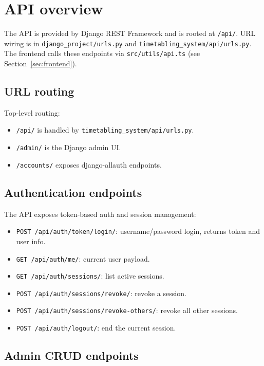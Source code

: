 \section{API overview}
\label{sec:api}

The API is provided by Django REST Framework and is rooted at \texttt{/api/}. URL wiring is in \texttt{django\_project/urls.py} and \texttt{timetabling\_system/api/urls.py}. The frontend calls these endpoints via \texttt{src/utils/api.ts} (see Section~\ref{sec:frontend}).

\subsection{URL routing}
\label{subsec:api:routing}

Top-level routing:

\begin{itemize}
  \item \texttt{/api/} is handled by \texttt{timetabling\_system/api/urls.py}.
  \item \texttt{/admin/} is the Django admin UI.
  \item \texttt{/accounts/} exposes django-allauth endpoints.
\end{itemize}

\subsection{Authentication endpoints}
\label{subsec:api:auth}

The API exposes token-based auth and session management:

\begin{itemize}
  \item \texttt{POST /api/auth/token/login/}: username/password login, returns token and user info.
  \item \texttt{GET /api/auth/me/}: current user payload.
  \item \texttt{GET /api/auth/sessions/}: list active sessions.
  \item \texttt{POST /api/auth/sessions/revoke/}: revoke a session.
  \item \texttt{POST /api/auth/sessions/revoke-others/}: revoke all other sessions.
  \item \texttt{POST /api/auth/logout/}: end the current session.
\end{itemize}

\subsection{Admin CRUD endpoints}
\label{subsec:api:crud}

